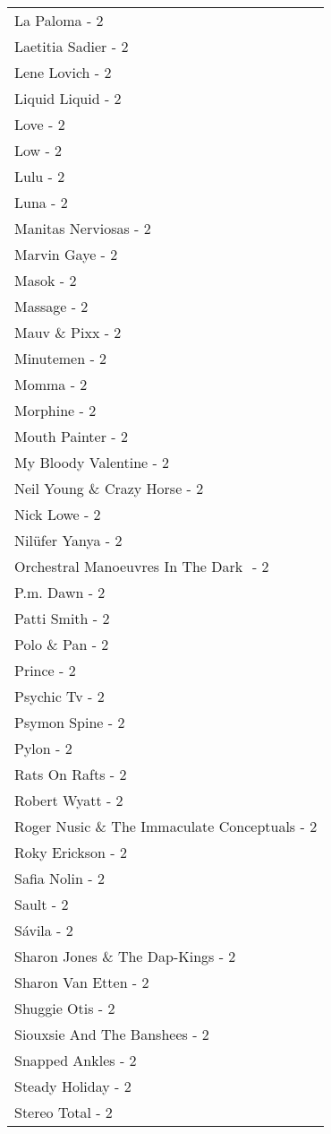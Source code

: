 \documentclass[
]{article}
\begin{document}
\begin{longtable}{l}
La Paloma - 2 \\ 
Laetitia Sadier - 2 \\ 
Lene Lovich - 2 \\ 
Liquid Liquid - 2 \\ 
Love - 2 \\ 
Low - 2 \\ 
Lulu - 2 \\ 
Luna - 2 \\ 
Manitas Nerviosas - 2 \\ 
Marvin Gaye - 2 \\ 
Masok - 2 \\ 
Massage - 2 \\ 
Mauv \& Pixx - 2 \\ 
Minutemen - 2 \\ 
Momma - 2 \\ 
Morphine - 2 \\ 
Mouth Painter - 2 \\ 
My Bloody Valentine - 2 \\ 
Neil Young \& Crazy Horse - 2 \\ 
Nick Lowe - 2 \\ 
Nilüfer Yanya - 2 \\ 
Orchestral Manoeuvres In The Dark ‎ - 2 \\ 
P.m. Dawn - 2 \\ 
Patti Smith - 2 \\ 
Polo \& Pan - 2 \\ 
Prince - 2 \\ 
Psychic Tv - 2 \\ 
Psymon Spine - 2 \\ 
Pylon - 2 \\ 
Rats On Rafts - 2 \\ 
Robert Wyatt - 2 \\ 
Roger Nusic \& The Immaculate Conceptuals - 2 \\ 
Roky Erickson - 2 \\ 
Safia Nolin - 2 \\ 
Sault - 2 \\ 
Sávila - 2 \\ 
Sharon Jones \& The Dap-Kings - 2 \\ 
Sharon Van Etten - 2 \\ 
Shuggie Otis - 2 \\ 
Siouxsie And The Banshees - 2 \\ 
Snapped Ankles - 2 \\ 
Steady Holiday - 2 \\ 
Stereo Total - 2 \\ 

\end{longtable}
\end{document}
